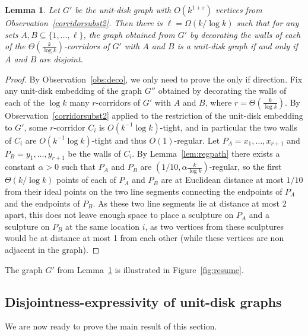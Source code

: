 \documentclass[a4paper,reqno, 12pt]{amsart}
\newtheorem{lemma}[theorem]{Lemma}
\begin{document}
\begin{lemma}\label{lem:deco}
Let $G'$ be the unit-disk graph with $O(k^{1+\varepsilon})$ vertices from
Observation~\ref{corridorsubst2}. Then there
is $\ell=\Omega(k/\log k)$ such that for any sets $A,B\subseteq\{1,\ldots,\ell\}$, the graph obtained from $G'$ by decorating the walls of each of the $\Theta \left (\tfrac{k}{\log k} \right )$-corridors of $G'$ with $A$ and $B$ is
a unit-disk graph if and only if $A$ and $B$ are disjoint.
\end{lemma}

\begin{proof}
  By Observation~\ref{obs:deco}, we only need to prove the only if direction.
  Fix any unit-disk embedding of the graph $G''$ obtained by
  decorating the walls  of each of the $\log k$ many $r$-corridors of $G'$
  with $A$ and $B$, where $r=\Theta \left (\tfrac{k}{\log k}\right )$.
By Observation~\ref{corridorsubst2} applied to the restriction of the
unit-disk embedding to $G'$, some $r$-corridor $C_i$  is
$O(k^{-1}\log k)$-tight, and in particular the two walls of $C_i$ are
$O(k^{-1}\log k)$-tight and thus $O(1)$-regular. Let
$P_A=x_1,\ldots,x_{r+1}$ and $P_B=y_1,\ldots,y_{r+1}$ be the walls of $C_i$. By Lemma~\ref{lem:regpath} there exists a constant $\alpha>0$ such that $P_A$
and $P_B$ are $\left (1/10,\alpha \tfrac{k}{\log k} \right )$-regular, so the first
$\Theta(k/\log k)$ points of each of $P_A$ and $P_B$ are at Euclidean
distance at most $1/10$
from their ideal points on the two line segments connecting the endpoints
of $P_A$ and the endpoints of $P_B$. As these two line segments lie at
distance at most 2 apart, this does not leave enough space to place a
sculpture on $P_A$ and a sculpture on $P_B$ at the same location $i$,
as
two vertices from these sculptures would be at distance at most 1 from
each other
(while these vertices are non adjacent in the graph).
\end{proof}

The graph $G'$ from Lemma~\ref{lem:deco} is illustrated in Figure~\ref{fig:resume}.

 

\subsection{Disjointness-expressivity of unit-disk graphs}

We are now ready to prove the main result of this section.
\end{document}
